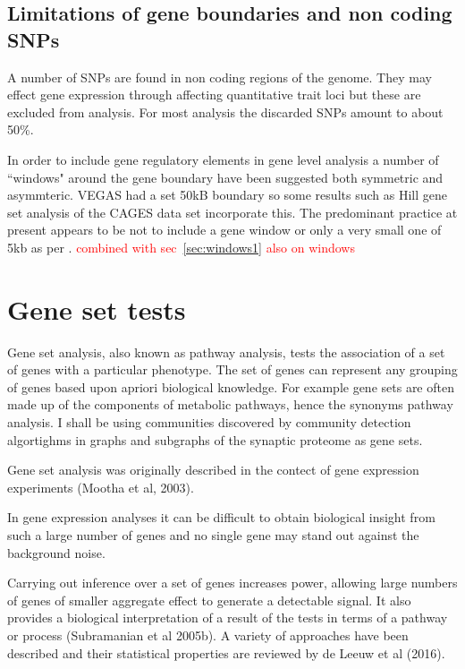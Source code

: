 \subsection{Limitations of gene boundaries and non coding SNPs}
A number of SNPs are found in non coding regions of the genome. They may effect gene expression through affecting quantitative trait loci but these are excluded from analysis. For most analysis the discarded SNPs amount to about 50\%.

In order to include gene regulatory elements in gene level analysis a number of ``windows" around the gene boundary have been suggested both symmetric and asymmteric. VEGAS had a set 50kB boundary so some results such as Hill \cite{hill2014human} gene set analysis of the CAGES data set incorporate this. The predominant practice at present appears to be not to include a gene window or only a very small one of 5kb as per \cite{savage2018genome}. \textcolor{red}{combined with sec~\ref{sec:windows1} also on windows}


\section{ Gene set tests}
Gene set analysis, also known as pathway analysis, tests the association of a set of genes with a particular phenotype. The set of genes can represent any grouping of genes based upon apriori biological knowledge. For example gene sets are often made up of the components of metabolic pathways, hence the synonyms pathway analysis. I shall be using communities discovered by community detection algortighms in graphs and subgraphs of the synaptic proteome as gene sets.

Gene set analysis was originally described in the contect of gene expression experiments (Mootha et al, 2003).

In gene expression analyses it can be difficult to obtain biological insight from such a large number of genes and no single gene may stand out against the background noise.

Carrying out inference over a set of genes increases power, allowing large numbers of genes of smaller aggregate effect to generate a detectable signal. It also provides a biological interpretation of a result of the tests in terms of a pathway or process (Subramanian et al 2005b). A variety of approaches have been described and their statistical properties are reviewed by de Leeuw et al (2016).

